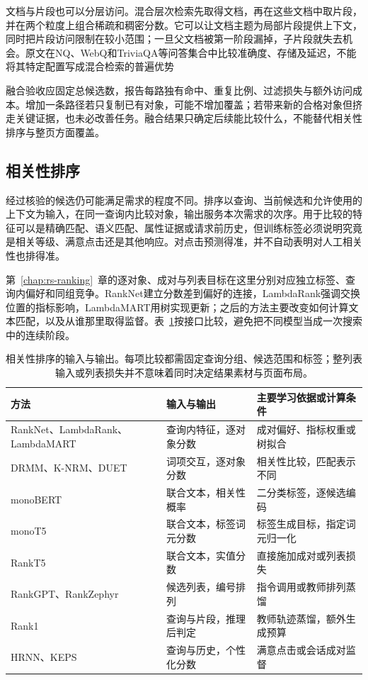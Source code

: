 文档与片段也可以分层访问。混合层次检索先取得文档，再在这些文档中取片段，并在两个粒度上组合稀疏和稠密分数。它可以让文档主题为局部片段提供上下文，同时把片段访问限制在较小范围；一旦父文档被第一阶段漏掉，子片段就失去机会。原文在NQ、WebQ和TriviaQA等问答集合中比较准确度、存储及延迟，不能将其特定配置写成混合检索的普遍优势

融合验收应固定总候选数，报告每路独有命中、重复比例、过滤损失与额外访问成本。增加一条路径若只复制已有对象，可能不增加覆盖；若带来新的合格对象但挤走关键证据，也未必改善任务。融合结果只确定后续能比较什么，不能替代相关性排序与整页方面覆盖。

\subsection{相关性排序}
\label{sec:rs-search-ranking}

经过核验的候选仍可能满足需求的程度不同。排序以查询、当前候选和允许使用的上下文为输入，在同一查询内比较对象，输出服务本次需求的次序。用于比较的特征可以是精确匹配、语义匹配、属性证据或请求前历史，但训练标签必须说明究竟是相关等级、满意点击还是其他响应。对点击预测得准，并不自动表明对人工相关性也排得准。

第~\ref{chap:rs-ranking}~章的逐对象、成对与列表目标在这里分别对应独立标签、查询内偏好和同组竞争。RankNet建立分数差到偏好的连接，LambdaRank强调交换位置的指标影响，LambdaMART用树实现更新；之后的方法主要改变如何计算文本匹配，以及从谁那里取得监督。表~\ref{tab:rs-search-rankers}按接口比较，避免把不同模型当成一次搜索中的连续阶段。

\begin{table}[htbp]
 \centering
 \begin{tabularx}{\linewidth}{lXX}
  \toprule
  方法 & 输入与输出 & 主要学习依据或计算条件 \\
  \midrule
  RankNet、LambdaRank、LambdaMART & 查询内特征，逐对象分数 & 成对偏好、指标权重或树拟合 \\
  DRMM、K-NRM、DUET & 词项交互，逐对象分数 & 相关性比较，匹配表示不同 \\
  monoBERT & 联合文本，相关性概率 & 二分类标签，逐候选编码 \\
  monoT5 & 联合文本，标签词元分数 & 标签生成目标，指定词元归一化 \\
  RankT5 & 联合文本，实值分数 & 直接施加成对或列表损失 \\
  RankGPT、RankZephyr & 候选列表，编号排列 & 指令调用或教师排列蒸馏 \\
  Rank1 & 查询与片段，推理后判定 & 教师轨迹蒸馏，额外生成预算 \\
  HRNN、KEPS & 查询与历史，个性化分数 & 满意点击或会话成对监督 \\
  \bottomrule
 \end{tabularx}
 \caption{相关性排序的输入与输出。每项比较都需固定查询分组、候选范围和标签；整列表输入或列表损失并不意味着同时决定结果素材与页面布局。}
 \label{tab:rs-search-rankers}
\end{table}

